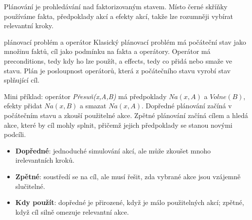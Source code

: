 \ucivo
\begin{intuice}
Plánování je prohledávání nad faktorizovaným stavem. Místo černé skříňky používáme fakta, předpoklady akcí a efekty akcí, takže lze rozumněji vybírat relevantní kroky.
\end{intuice}

\begin{defbox}{plánovací problém a operátor}
Klasický plánovací problém má počáteční stav jako množinu faktů, cíl jako podmínku na fakta a operátory. Operátor má preconditions, tedy kdy ho lze použít, a effects, tedy co přidá nebo smaže ve stavu. Plán je posloupnost operátorů, která z počátečního stavu vyrobí stav splňující cíl.
\end{defbox}

Mini příklad: operátor \emph{Přesuň(x,A,B)} má předpoklady $Na(x,A)$ a $Volne(B)$, efekty přidat $Na(x,B)$ a smazat $Na(x,A)$. Dopředné plánování začíná v počátečním stavu a zkouší použitelné akce. Zpětné plánování začíná cílem a hledá akce, které by cíl mohly splnit, přičemž jejich předpoklady se stanou novými podcíli.

\begin{itemize}[leftmargin=1.2em,itemsep=1pt,topsep=1pt]
  \item \textbf{Dopředné}: jednoduché simulování akcí, ale může zkoušet mnoho irelevantních kroků.
  \item \textbf{Zpětné}: soustředí se na cíl, ale musí řešit, zda vybrané akce jsou vzájemně slučitelné.
  \item \textbf{Kdy použít}: dopředné je přirozené, když je málo použitelných akcí; zpětné, když cíl silně omezuje relevantní akce.
\end{itemize}

